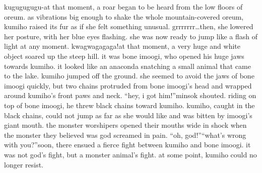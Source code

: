 kugugugugu-at that moment, a roar began to be heard from the low floors of oreum.
as vibrations big enough to shake the whole mountain-covered oreum, kumiho raised its fur as if she felt something unusual.
grrrrrrr…then, she lowered her posture, with her blue eyes flashing.
 she was now ready to jump like a flash of light at any moment.
kwagwagagaga!at that moment, a very huge and white object soared up the steep hill.
it was bone imoogi, who opened his huge jaws towards kumiho.
it looked like an anaconda snatching a small animal that came to the lake.
kumiho jumped off the ground.
 she seemed to avoid the jaws of bone imoogi quickly, but two chains protruded from bone imoogi’s head and wrapped around kumiho’s front paws and neck.
“hey, i got him!”minsok shouted.
 riding on top of bone imoogi, he threw black chains toward kumiho.
kumiho, caught in the black chains, could not jump as far as she would like and was bitten by imoogi’s giant mouth.
the monster worshipers opened their mouths wide in shock when the monster they believed was god screamed in pain.
“oh, god!”“what’s wrong with you?”soon, there ensued a fierce fight between kumiho and bone imoogi.
 it was not god’s fight, but a monster animal’s fight.
 at some point, kumiho could no longer resist.


 